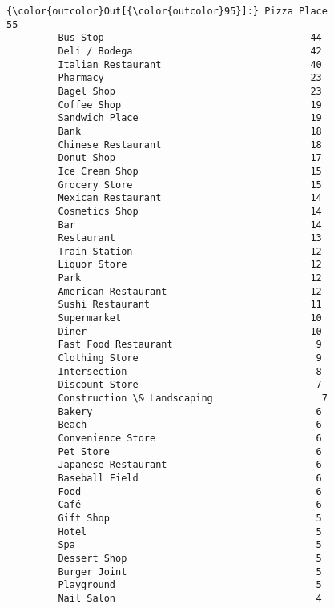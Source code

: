 \documentclass[11pt]{article}
\begin{document}
\begin{Verbatim}[commandchars=\\\{\}]
{\color{outcolor}Out[{\color{outcolor}95}]:} Pizza Place                                 55
         Bus Stop                                    44
         Deli / Bodega                               42
         Italian Restaurant                          40
         Pharmacy                                    23
         Bagel Shop                                  23
         Coffee Shop                                 19
         Sandwich Place                              19
         Bank                                        18
         Chinese Restaurant                          18
         Donut Shop                                  17
         Ice Cream Shop                              15
         Grocery Store                               15
         Mexican Restaurant                          14
         Cosmetics Shop                              14
         Bar                                         14
         Restaurant                                  13
         Train Station                               12
         Liquor Store                                12
         Park                                        12
         American Restaurant                         12
         Sushi Restaurant                            11
         Supermarket                                 10
         Diner                                       10
         Fast Food Restaurant                         9
         Clothing Store                               9
         Intersection                                 8
         Discount Store                               7
         Construction \& Landscaping                   7
         Bakery                                       6
         Beach                                        6
         Convenience Store                            6
         Pet Store                                    6
         Japanese Restaurant                          6
         Baseball Field                               6
         Food                                         6
         Café                                         6
         Gift Shop                                    5
         Hotel                                        5
         Spa                                          5
         Dessert Shop                                 5
         Burger Joint                                 5
         Playground                                   5
         Nail Salon                                   4

\end{Verbatim}
\end{document}
